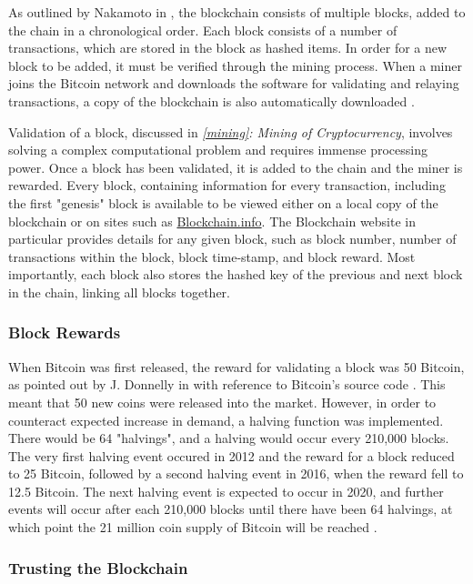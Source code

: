 As outlined by Nakamoto in \cite{snakamoto}, the blockchain consists of multiple blocks, added to the chain in a chronological order. Each block consists of a number of transactions, which are stored in the block as hashed items. In order for a new block to be added, it must be verified through the mining process. When a miner joins the Bitcoin network and downloads the software for validating and relaying transactions, a copy of the blockchain is also automatically downloaded \cite{blkchMS}. 

Validation of a block, discussed in \textit{\ref{mining}: Mining of Cryptocurrency}, involves solving a complex computational problem and requires immense processing power. Once a block has been validated, it is added to the chain and the miner is rewarded. Every block, containing information for every transaction, including the first "genesis" block is available to be viewed either on a local copy of the blockchain or on sites such as \textcolor{NavyBlue}{\href{https://blockchain.info/}{Blockchain.info}}. The Blockchain website in particular provides details for any given block, such as block number, number of transactions within the block, block time-stamp, and block reward. Most importantly, each block also stores the hashed key of the previous and next block in the chain, linking all blocks together.

\subsubsection{Block Rewards}

When Bitcoin was first released, the reward for validating a block was 50 Bitcoin, as pointed out by J. Donnelly in \cite{halving} with reference to Bitcoin's source code \cite{btcsc}. This meant that 50 new coins were released into the market. However, in order to counteract expected increase in demand, a halving function was implemented. There would be 64 "halvings", and a halving would occur every 210,000 blocks. The very first halving event occured in 2012 and the reward for a block reduced to 25 Bitcoin, followed by a second halving event in 2016, when the reward fell to 12.5 Bitcoin. The next halving event is expected to occur in 2020, and further events will occur after each 210,000 blocks until there have been 64 halvings, at which point the 21 million coin supply of Bitcoin will be reached \cite{halving} \cite{btcsc}.


\subsubsection{Trusting the Blockchain}

